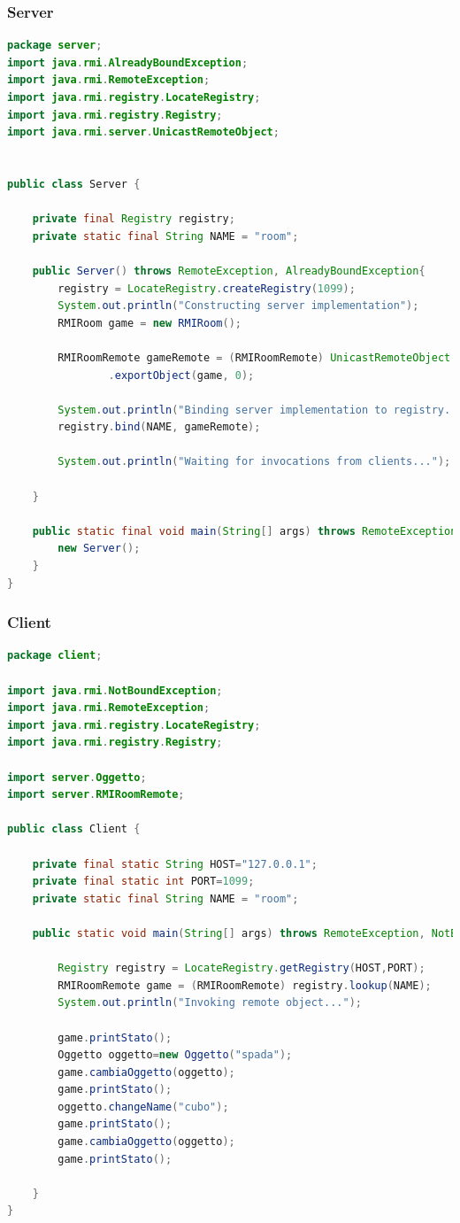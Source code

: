 \documentclass{article}
\begin{document}
\subsubsection{Server}
\begin{lstlisting}[language=Java,escapechar=|]
package server;
import java.rmi.AlreadyBoundException;
import java.rmi.RemoteException;
import java.rmi.registry.LocateRegistry;
import java.rmi.registry.Registry;
import java.rmi.server.UnicastRemoteObject;


public class Server {

	private final Registry registry;
	private static final String NAME = "room";
	
	public Server() throws RemoteException, AlreadyBoundException{
		registry = LocateRegistry.createRegistry(1099);
		System.out.println("Constructing server implementation");
		RMIRoom game = new RMIRoom();

		RMIRoomRemote gameRemote = (RMIRoomRemote) UnicastRemoteObject
				.exportObject(game, 0);

		System.out.println("Binding server implementation to registry...");
		registry.bind(NAME, gameRemote);

		System.out.println("Waiting for invocations from clients...");
	
	}

	public static final void main(String[] args) throws RemoteException, AlreadyBoundException{
		new Server();
	}
}
\end{lstlisting}

\subsubsection{Client}
\begin{lstlisting}[language=Java,escapechar=|]
package client;

import java.rmi.NotBoundException;
import java.rmi.RemoteException;
import java.rmi.registry.LocateRegistry;
import java.rmi.registry.Registry;

import server.Oggetto;
import server.RMIRoomRemote;

public class Client {

	private final static String HOST="127.0.0.1";
	private final static int PORT=1099;
	private static final String NAME = "room";
	
	public static void main(String[] args) throws RemoteException, NotBoundException {
		
		Registry registry = LocateRegistry.getRegistry(HOST,PORT);
		RMIRoomRemote game = (RMIRoomRemote) registry.lookup(NAME);
		System.out.println("Invoking remote object...");
		
		game.printStato();
		Oggetto oggetto=new Oggetto("spada");
		game.cambiaOggetto(oggetto);
		game.printStato();
		oggetto.changeName("cubo");
		game.printStato();
		game.cambiaOggetto(oggetto);
		game.printStato();
		
	}
}
\end{lstlisting}
\end{document}
